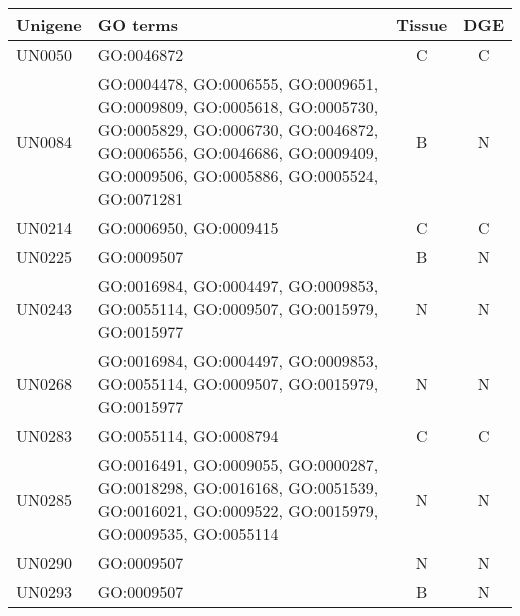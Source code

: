\documentclass[11pt]{article}
\begin{document}
\begin{table}[t]
\centering
\begin{tabularx}{\textwidth}{lXcc}
\toprule
Unigene & 
GO terms    & Tissue                                                                                                                                                                          & DGE &   \\ \midrule
UN0050 & GO:0046872                                                                                                                                                                      & C   & C \\
UN0084 & GO:0004478, GO:0006555, GO:0009651, GO:0009809, GO:0005618, GO:0005730, GO:0005829, GO:0006730, GO:0046872, GO:0006556, GO:0046686, GO:0009409, GO:0009506, GO:0005886, GO:0005524, GO:0071281 & B   & N \\
UN0214 & GO:0006950, GO:0009415                                                                                                                                                           & C   & C \\
UN0225 & GO:0009507                                                                                                                                                                      & B   & N \\
UN0243 & GO:0016984, GO:0004497, GO:0009853, GO:0055114, GO:0009507, GO:0015979, GO:0015977                                                                                                    & N   & N \\
UN0268 & GO:0016984, GO:0004497, GO:0009853, GO:0055114, GO:0009507, GO:0015979, GO:0015977                                                                                                    & N   & N \\
UN0283 & GO:0055114, GO:0008794                                                                                                                                                           & C   & C \\
UN0285 & GO:0016491, GO:0009055, GO:0000287, GO:0018298, GO:0016168, GO:0051539, GO:0016021, GO:0009522, GO:0015979, GO:0009535, GO:0055114                                                        & N   & N \\
UN0290 & GO:0009507                                                                                                                                                                      & N   & N \\
UN0293 & GO:0009507                                                                                                                                                                      & B   & N \\

\end{tabularx}
\end{table}
\end{document}
